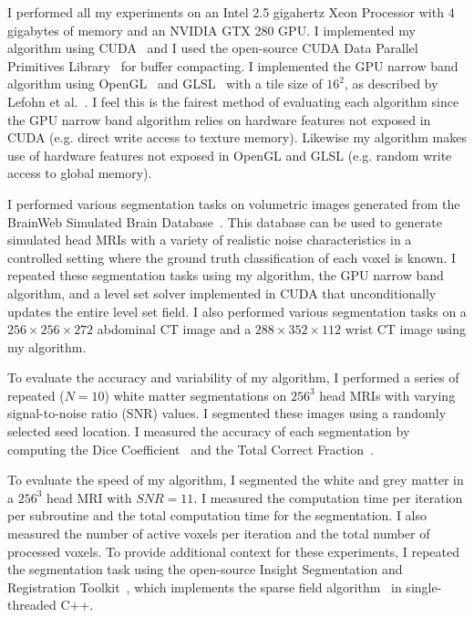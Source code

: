 I performed all my experiments on an Intel 2.5 gigahertz Xeon Processor with 4 gigabytes of memory and an NVIDIA GTX 280 GPU. I implemented my algorithm using CUDA~\cite{NVIDIACUDA-2010} and I used the open-source CUDA Data Parallel Primitives Library~\cite{CUDPP-2010} for buffer compacting. I implemented the GPU narrow band algorithm using OpenGL~\cite{Shreiner-2005} and GLSL~\cite{Rost-2006} with a tile size of $16^2$, as described by Lefohn et al.~\cite{Lefohn-2003-MICCAI,Lefohn-2003-Vis,Lefohn-2004}. I feel this is the fairest method of evaluating each algorithm since the GPU narrow band algorithm relies on hardware features not exposed in CUDA (e.g. direct write access to texture memory). Likewise my algorithm makes use of hardware features not exposed in OpenGL and GLSL (e.g. random write access to global memory).

I performed various segmentation tasks on volumetric images generated from the BrainWeb Simulated Brain Database~\cite{BrainWeb-2010,Kwan-1996,Cocosco-1997,Collins-1998,Kwan-1999}. This database can be used to generate simulated head MRIs with a variety of realistic noise characteristics in a controlled setting where the ground truth classification of each voxel is known. I repeated these segmentation tasks using my algorithm, the GPU narrow band algorithm, and a level set solver implemented in CUDA that unconditionally updates the entire level set field. I also performed various segmentation tasks on a $256 \times 256 \times 272$ abdominal CT image and a $288 \times 352 \times 112$ wrist CT image using my algorithm.

To evaluate the accuracy and variability of my algorithm, I performed a series of repeated ($N=10$) white matter segmentations on ${256}^3$ head MRIs with varying signal-to-noise ratio (SNR) values. I segmented these images using a randomly selected seed location. I measured the accuracy of each segmentation by computing the Dice Coefficient~\cite{Shattuck-2009,Jeong-2009} and the Total Correct Fraction~\cite{Lefohn-2003-MICCAI,Cates-2004}.

To evaluate the speed of my algorithm, I segmented the white and grey matter in a ${256}^3$ head MRI with $SNR=11$. I measured the computation time per iteration per subroutine and the total computation time for the segmentation. I also measured the number of active voxels per iteration and the total number of processed voxels. To provide additional context for these experiments, I repeated the segmentation task using the open-source Insight Segmentation and Registration Toolkit~\cite{Ibanez-2005}, which implements the sparse field algorithm~\cite{Whitaker-1998,Peng-1999} in single-threaded C++.

